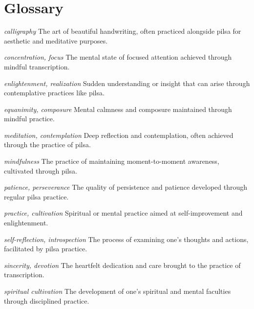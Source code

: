 \chapter*{Glossary}

\textbf{} \textit{calligraphy}
The art of beautiful handwriting, often practiced alongside pilsa for aesthetic and meditative purposes.
\vspace{12pt}

\textbf{} \textit{concentration, focus}
The mental state of focused attention achieved through mindful transcription.
\vspace{12pt}

\textbf{} \textit{enlightenment, realization}
Sudden understanding or insight that can arise through contemplative practices like pilsa.
\vspace{12pt}

\textbf{} \textit{equanimity, composure}
Mental calmness and composure maintained through mindful practice.
\vspace{12pt}

\textbf{} \textit{meditation, contemplation}
Deep reflection and contemplation, often achieved through the practice of pilsa.
\vspace{12pt}

\textbf{} \textit{mindfulness}
The practice of maintaining moment-to-moment awareness, cultivated through pilsa.
\vspace{12pt}

\textbf{} \textit{patience, perseverance}
The quality of persistence and patience developed through regular pilsa practice.
\vspace{12pt}

\textbf{} \textit{practice, cultivation}
Spiritual or mental practice aimed at self-improvement and enlightenment.
\vspace{12pt}

\textbf{} \textit{self-reflection, introspection}
The process of examining one's thoughts and actions, facilitated by pilsa practice.
\vspace{12pt}

\textbf{} \textit{sincerity, devotion}
The heartfelt dedication and care brought to the practice of transcription.
\vspace{12pt}

\textbf{} \textit{spiritual cultivation}
The development of one's spiritual and mental faculties through disciplined practice.
\vspace{12pt}

